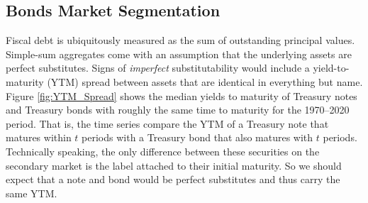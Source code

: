 \documentclass[11pt,a4paper,margin=1.5in]{article}
\begin{document}

\subsection{Bonds Market Segmentation}
\label{subsec:MktSeg}
Fiscal debt is ubiquitously measured as the sum of outstanding principal values.
Simple-sum aggregates come with an assumption that the underlying assets are perfect substitutes. 
Signs of {\em imperfect} substitutability would include a yield-to-maturity (YTM) spread between assets that are identical in everything but name.
Figure \ref{fig:YTM_Spread} shows the median yields to maturity of Treasury notes and Treasury bonds with roughly the same time to maturity for the 1970--2020 period.
That is, the time series compare the YTM of a Treasury note that matures within $t$ periods with a Treasury bond that also matures with $t$ periods.
Technically speaking, the only difference between these securities on the secondary market is the label attached to their initial maturity.
So we should expect that a note and bond would be perfect substitutes and thus carry the same YTM.
\end{document}
